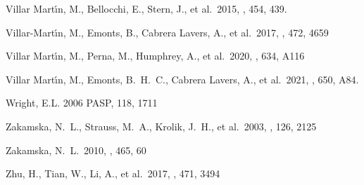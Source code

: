 \documentclass{aa}
\begin{document}
\begin{thebibliography}
 Villar Mart{\'\i}n, M., Bellocchi, E., Stern, J., et al.\ 2015, \mnras, 454, 439.

 Villar-Mart{\'\i}n, M., Emonts, B., Cabrera Lavers, A., et al.\ 2017, \mnras, 472, 4659

 Villar Mart{\'\i}n, M., Perna, M., Humphrey, A., et al.\ 2020, \aap, 634, A116

 Villar Mart{\'\i}n, M., Emonts, B.~H.~C., Cabrera Lavers, A., et al.\ 2021, \aap, 650, A84.

Wright, E.L. 2006 PASP, 118, 1711

 Zakamska, N.~L., Strauss, M.~A., Krolik, J.~H., et al.\ 2003, \aj, 126, 2125

 Zakamska, N.~L.\ 2010, \nat, 465, 60

 Zhu, H., Tian, W., Li, A., et al.\ 2017, \mnras, 471, 3494

\end{thebibliography}
\end{document}
